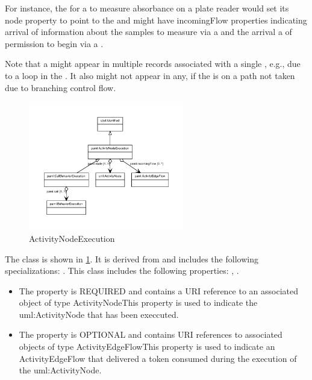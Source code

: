        For instance, the  for a  to measure absorbance on a plate reader
        would set its node property to point to the  and might have incomingFlow properties
        indicating arrival of information about the samples to measure via a  and the arrival a
        of permission to begin via a .

        Note that a  might appear in multiple  records associated with a single
        , e.g., due to a loop in the .  It also might not appear in any, if the
         is on a path not taken due to branching control flow.%
\newline%
\linebreak%


\begin{figure}[h!]%
\centering%
\includegraphics[width=0.6061702127659574\textwidth]{paml_classes/ActivityNodeExecution_abstraction_hierarchy.pdf}%
\caption{ActivityNodeExecution}%
\label{fig:ActivityNodeExecution}%
\end{figure}

%
The  class is shown in \ref{fig:ActivityNodeExecution}. It is derived from  and includes the following specializations: . %
This class includes the following properties: , . %
\begin{itemize}%
\item%
The  property is REQUIRED and contains a URI reference to an associated object of type ActivityNodeThis property is used to indicate the uml:ActivityNode that has been execcuted.%
\item%
The  property is OPTIONAL and contains URI references to associated objects of type ActivityEdgeFlowThis property is used to indicate an ActivityEdgeFlow that delivered a token consumed during
        the execution of the uml:ActivityNode.%
\end{itemize}%
